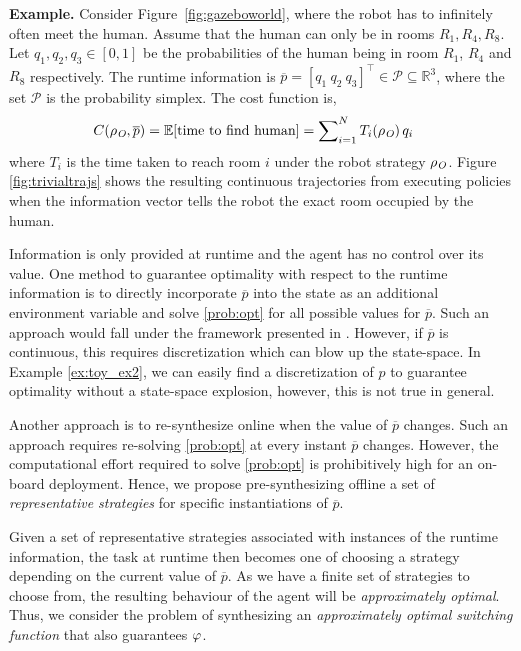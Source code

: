 \begin{itshape}
\textbf{Example.} Consider Figure~\ref{fig:gazeboworld}, where the robot has to infinitely often meet the human. Assume that the human can only be in rooms $R_1, R_4, R_8$. Let $q_1,q_2,q_3\in[0,1]$ be the probabilities of the human being in room $R_1$, $R_4$ and $R_8$ respectively. The runtime information is $\overline{p}= {[q_1\ q_2\ q_3]}^\top \in\mathcal{P}\subseteq \mathbb{R}^3$, where the set $\mathcal{P}$ is the probability simplex. The cost function is, 
\begin{align}
C(\rho_{\textit{O}}, \overline{p}) &= \mathbb E\lbrack\text{time to find human\rbrack}= \sum\nolimits_{i=1}^N T_i(\rho_{\textit{O}})\, q_i\label{eq:cost_fun}
\end{align}
where $T_i$ is the time taken to reach room $i$ under the robot strategy $\rho_{\textit{O}}$. Figure \ref{fig:trivialtrajs} shows the resulting continuous trajectories from executing policies when the information vector tells the robot the exact room occupied by the human. \label{ex:toy_ex2}
\end{itshape}


Information is only provided at runtime and the agent has no control over its value. One method to guarantee optimality with respect to the runtime information is to directly incorporate $\overline{p}$ into the state as an additional environment variable and solve \eqref{prob:opt} for all possible values for $\overline{p}$. Such an approach would fall under the framework presented in \cite{rudiger}. However, if $\overline{p}$ is continuous, this requires discretization which can blow up the state-space. In Example \ref{ex:toy_ex2}, we can easily find a discretization of $p$ to guarantee optimality without a state-space explosion, however, this is not true in general.

Another approach is to re-synthesize online when the value of $\overline{p}$ changes. Such an approach requires re-solving \eqref{prob:opt} at every instant $\overline{p}$ changes. However, the computational effort required to solve \eqref{prob:opt} is prohibitively high for an on-board deployment. Hence, we propose pre-synthesizing offline a set of \emph{representative strategies} for specific instantiations of $\overline{p}$.

Given a set of representative strategies associated with instances of the runtime information, the task at runtime then becomes one of choosing a strategy depending on the current value of $\overline p$. As we have a finite set of strategies to choose from, the resulting behaviour of the agent will be \emph{approximately optimal}. Thus, we consider the problem of synthesizing an \emph{approximately optimal switching function} that also guarantees $\varphi$.

